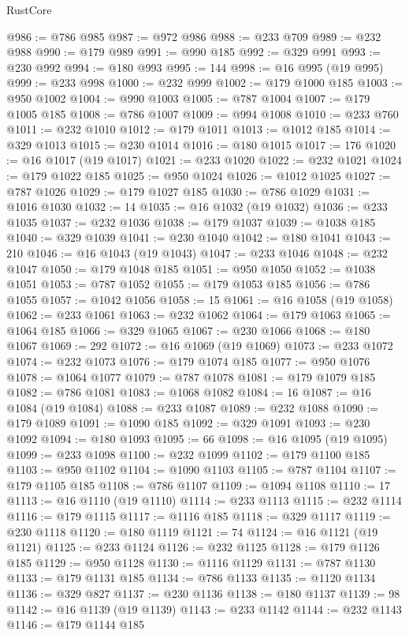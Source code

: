 \begin{lexlean}{RustCore}
\begin{coremodule}
@986 := @786 @985
@987 := @972 @986
@988 := @233 @709
@989 := @232 @988
@990 := @179 @989
@991 := @990 @185
@992 := @329 @991
@993 := @230 @992
@994 := @180 @993
@995 := 144
@998 := @16 @995 (@19 @995)
@999 := @233 @998
@1000 := @232 @999
@1002 := @179 @1000 @185
@1003 := @950 @1002
@1004 := @990 @1003
@1005 := @787 @1004
@1007 := @179 @1005 @185
@1008 := @786 @1007
@1009 := @994 @1008
@1010 := @233 @760
@1011 := @232 @1010
@1012 := @179 @1011
@1013 := @1012 @185
@1014 := @329 @1013
@1015 := @230 @1014
@1016 := @180 @1015
@1017 := 176
@1020 := @16 @1017 (@19 @1017)
@1021 := @233 @1020
@1022 := @232 @1021
@1024 := @179 @1022 @185
@1025 := @950 @1024
@1026 := @1012 @1025
@1027 := @787 @1026
@1029 := @179 @1027 @185
@1030 := @786 @1029
@1031 := @1016 @1030
@1032 := 14
@1035 := @16 @1032 (@19 @1032)
@1036 := @233 @1035
@1037 := @232 @1036
@1038 := @179 @1037
@1039 := @1038 @185
@1040 := @329 @1039
@1041 := @230 @1040
@1042 := @180 @1041
@1043 := 210
@1046 := @16 @1043 (@19 @1043)
@1047 := @233 @1046
@1048 := @232 @1047
@1050 := @179 @1048 @185
@1051 := @950 @1050
@1052 := @1038 @1051
@1053 := @787 @1052
@1055 := @179 @1053 @185
@1056 := @786 @1055
@1057 := @1042 @1056
@1058 := 15
@1061 := @16 @1058 (@19 @1058)
@1062 := @233 @1061
@1063 := @232 @1062
@1064 := @179 @1063
@1065 := @1064 @185
@1066 := @329 @1065
@1067 := @230 @1066
@1068 := @180 @1067
@1069 := 292
@1072 := @16 @1069 (@19 @1069)
@1073 := @233 @1072
@1074 := @232 @1073
@1076 := @179 @1074 @185
@1077 := @950 @1076
@1078 := @1064 @1077
@1079 := @787 @1078
@1081 := @179 @1079 @185
@1082 := @786 @1081
@1083 := @1068 @1082
@1084 := 16
@1087 := @16 @1084 (@19 @1084)
@1088 := @233 @1087
@1089 := @232 @1088
@1090 := @179 @1089
@1091 := @1090 @185
@1092 := @329 @1091
@1093 := @230 @1092
@1094 := @180 @1093
@1095 := 66
@1098 := @16 @1095 (@19 @1095)
@1099 := @233 @1098
@1100 := @232 @1099
@1102 := @179 @1100 @185
@1103 := @950 @1102
@1104 := @1090 @1103
@1105 := @787 @1104
@1107 := @179 @1105 @185
@1108 := @786 @1107
@1109 := @1094 @1108
@1110 := 17
@1113 := @16 @1110 (@19 @1110)
@1114 := @233 @1113
@1115 := @232 @1114
@1116 := @179 @1115
@1117 := @1116 @185
@1118 := @329 @1117
@1119 := @230 @1118
@1120 := @180 @1119
@1121 := 74
@1124 := @16 @1121 (@19 @1121)
@1125 := @233 @1124
@1126 := @232 @1125
@1128 := @179 @1126 @185
@1129 := @950 @1128
@1130 := @1116 @1129
@1131 := @787 @1130
@1133 := @179 @1131 @185
@1134 := @786 @1133
@1135 := @1120 @1134
@1136 := @329 @827
@1137 := @230 @1136
@1138 := @180 @1137
@1139 := 98
@1142 := @16 @1139 (@19 @1139)
@1143 := @233 @1142
@1144 := @232 @1143
@1146 := @179 @1144 @185

\end{coremodule}
\end{lexlean}
